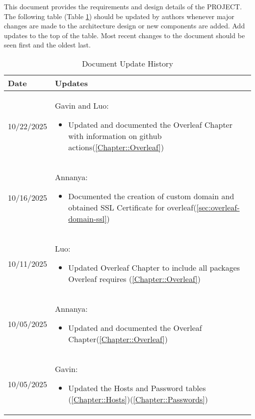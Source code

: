 This document provides the requirements and design details of the
PROJECT.  The following table (Table \ref{Table::UpdateHistory}) should be
updated by authors whenever major changes are made to the architecture
design or new components are added. Add updates to the top of the table.  
Most recent changes to the document should be seen first and the oldest 
last.

\begin{longtable}{|l||p{13.5cm}|}
\caption{Document Update History \label{Table::UpdateHistory}}\\
\hline
\textbf{Date} & \textbf{Updates} \\
\hline 
\endhead

10/22/2025 & Gavin and Luo:
\begin{itemize}[topsep=0pt,itemsep=0pt,parsep=0pt,partopsep=0pt,leftmargin=12pt]
\item Updated and documented the Overleaf Chapter with information on github actions(\ref{Chapter::Overleaf})
\end{itemize} 
\\ \hline

10/16/2025 & Annanya:
\begin{itemize}[topsep=0pt,itemsep=0pt,parsep=0pt,partopsep=0pt,leftmargin=12pt]
\item Documented the creation of custom domain and obtained SSL Certificate for overleaf(\autoref{sec:overleaf-domain-ssl})
\end{itemize} 
\\ \hline

10/11/2025 & Luo:
\begin{itemize}[topsep=0pt,itemsep=0pt,parsep=0pt,partopsep=0pt,leftmargin=12pt]
\item Updated Overleaf Chapter to include all packages Overleaf requires (\ref{Chapter::Overleaf})
\end{itemize} 
\\ \hline

10/05/2025 & Annanya:
\begin{itemize}[topsep=0pt,itemsep=0pt,parsep=0pt,partopsep=0pt,leftmargin=12pt]
\item Updated and documented the Overleaf Chapter(\ref{Chapter::Overleaf})
\end{itemize} 
\\ \hline

10/05/2025 & Gavin:
\begin{itemize}[topsep=0pt,itemsep=0pt,parsep=0pt,partopsep=0pt,leftmargin=12pt]
\item Updated the Hosts and Password tables (\ref{Chapter::Hosts})(\ref{Chapter::Passwords})
\end{itemize} 
\\ \hline


\end{longtable}
